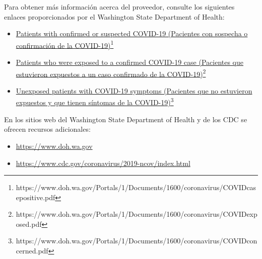 \documentclass[10pt]{article}
\newcommand{\link}[2]{\href{#1}{#2}\footnote{#1}}
\begin{document}
Para obtener más información acerca del proveedor, consulte los siguientes
enlaces proporcionados por el Washington State Department of Health:

\begin{itemize}
\item

  \link{https://www.doh.wa.gov/Portals/1/Documents/1600/coronavirus/COVIDcasepositive.pdf}{Patients
  with confirmed or suspected COVID-19 (Pacientes con sospecha o confirmación de
  la COVID-19)}

\item

  \link{https://www.doh.wa.gov/Portals/1/Documents/1600/coronavirus/COVIDexposed.pdf}{Patients
  who were exposed to a confirmed COVID-19 case (Pacientes que estuvieron
  expuestos a un caso confirmado de la COVID-19)}

\item

  \link{https://www.doh.wa.gov/Portals/1/Documents/1600/coronavirus/COVIDconcerned.pdf}{Unexposed
  patients with COVID-19 symptoms (Pacientes que no estuvieron expuestos y que
  tienen síntomas de la COVID-19)}

\end{itemize}

En los sitios web del Washington State Department of Health y de los CDC se
ofrecen recursos adicionales:

\begin{itemize}
\item

  \url{https://www.doh.wa.gov}

\item

  \url{https://www.cdc.gov/coronavirus/2019-ncov/index.html}

\end{itemize}
\end{document}

